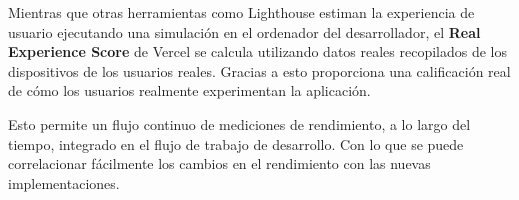 \documentclass[12pt,twoside,titlepage]{report}
\begin{document}
Mientras que otras herramientas como Lighthouse estiman la experiencia de usuario ejecutando una simulación en el ordenador del desarrollador, el \textbf{Real Experience Score} de Vercel se calcula utilizando datos reales recopilados de los dispositivos de los usuarios reales. Gracias a esto proporciona una calificación real de cómo los usuarios realmente experimentan la aplicación.

Esto permite un flujo continuo de mediciones de rendimiento, a lo largo del tiempo, integrado en el flujo de trabajo de desarrollo. Con lo que se puede correlacionar fácilmente los cambios en el rendimiento con las nuevas implementaciones.

\end{document}
